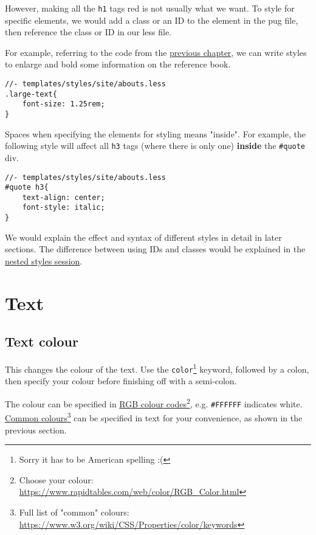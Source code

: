 However, making all the \texttt{h1} tags red is not usually what we want. To style for specific elements, we would add a class or an ID to the element in the pug file, then reference the class or ID in our less file.

For example, referring to the code from the \hyperref[sec:classesids]{previous chapter}, we can write styles to enlarge and bold some information on the reference book.

\begin{lstlisting}[language=pug]
//- templates/styles/site/abouts.less
.large-text{
    font-size: 1.25rem;
}
\end{lstlisting}

Spaces when specifying the elements for styling means "inside". For example, the following style will affect all \texttt{h3} tags (where there is only one) \textbf{inside} the \texttt{\#quote} div.

\begin{lstlisting}[language=pug]
//- templates/styles/site/abouts.less
#quote h3{
    text-align: center;
    font-style: italic;
}
\end{lstlisting}

We would explain the effect and syntax of different styles in detail in later sections. The difference between using IDs and classes would be explained in the \hyperref[sec:nestedstyles]{nested styles session}.

\section{Text}

\subsection{Text colour}

This changes the colour of the text. Use the \texttt{color}\footnote{Sorry it has to be American spelling :(} keyword, followed by a colon, then specify your colour before finishing off with a semi-colon.

The colour can be specified in \href{https://www.rapidtables.com/web/color/RGB_Color.html}{RGB colour codes}\footnote{Choose your colour: \url{https://www.rapidtables.com/web/color/RGB_Color.html}}, e.g. \texttt{\#FFFFFF} indicates white. \href{https://www.w3.org/wiki/CSS/Properties/color/keywords}{Common colours}\footnote{Full list of "common" colours: \url{https://www.w3.org/wiki/CSS/Properties/color/keywords}} can be specified in text for your convenience, as shown in the previous section.

